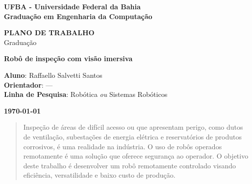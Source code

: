 \documentclass[12pt,a4paper]{article}
\begin{document}

\begin{titlepage}
\thispagestyle{empty}
\begin{center}
\large{\bf{UFBA - Universidade Federal da Bahia}} \\
\large{\bf{Graduação em Engenharia da Computação}} \\
\end{center}
\vfill

\centering
\textbf{{\LARGE PLANO DE TRABALHO}}  \\ \vspace{0.5cm}
{\LARGE Graduação}
\vfill




\textbf{{\Large Robô de inspeção com visão imersiva}} \\ %
\vfill
\begin{flushleft}
\textbf{Aluno}: Raffaello Salvetti Santos \hfill{}\\
\textbf{Orientador}: --- \hfill{}\\
\textbf{Linha de Pesquisa}: Robótica {\it ou} Sistemas Robóticos \hfill{}\\
\end{flushleft}

\vfill


\begin{center}
\large{\bf{\today}}
\end{center}
\end{titlepage}



\begin{abstract}
	Inspeção de áreas de difícil acesso ou que apresentam perigo, como dutos de ventilação, subestações de energia elétrica e reservatórios de produtos corrosivos, é uma realidade na indústria. O uso de robôs operados remotamente é uma solução que oferece segurança ao operador. O objetivo deste trabalho é desenvolver um robô remotamente controlado visando eficiência, versatilidade e baixo custo de produção.
\end{abstract}


\end{document}
